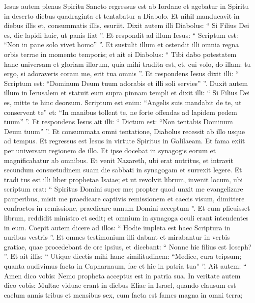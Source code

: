 \begin{biblechapter}
\begin{biblechapter}
\begin{biblechapter}
\begin{biblechapter}
\verse Iesus autem plenus Spiritu Sancto regressus est ab Iordane et agebatur in Spiritu in deserto 
\verse diebus quadraginta et tentabatur a Diabolo. Et nihil manducavit in diebus illis et, consummatis illis, esuriit. 
\verse Dixit autem illi Diabolus: “ Si Filius Dei es, dic lapidi huic, ut panis fiat ”. 
\verse Et respondit ad illum Iesus: “ Scriptum est: “Non in pane solo vivet homo” ”. 
\verse Et sustulit illum et ostendit illi omnia regna orbis terrae in momento temporis; 
 \verse et ait ei Diabolus: “ Tibi dabo potestatem hanc universam et gloriam illorum, quia mihi tradita est, et, cui volo, do illam: 
\verse tu ergo, si adoraveris coram me, erit tua omnis ”. 
\verse Et respondens Iesus dixit illi: “ Scriptum est: “Dominum Deum tuum adorabis et illi soli servies” ”. 
\verse Duxit autem illum in Ierusalem et statuit eum supra pinnam templi et dixit illi: “ Si Filius Dei es, mitte te hinc deorsum. 
\verse Scriptum est enim:
 “Angelis suis mandabit de te,
 ut conservent te”
 \verse et: “In manibus tollent te,
 ne forte offendas ad lapidem pedem tuum” ”.
 \verse Et respondens Iesus ait illi: “ Dictum est: “Non tentabis Dominum Deum tuum” ”. 
\verse Et consummata omni tentatione, Diabolus recessit ab illo usque ad tempus.
 \verse Et regressus est Iesus in virtute Spiritus in Galilaeam. Et fama exiit per universam regionem de illo. 
\verse Et ipse docebat in synagogis eorum et magnificabatur ab omnibus.
 \verse Et venit Nazareth, ubi erat nutritus, et intravit secundum consuetudinem suam die sabbati in synagogam et surrexit legere. 
\verse Et tradi tus est illi liber prophetae Isaiae; et
 ut revolvit librum, invenit locum, ubi scriptum erat:
 \verse “ Spiritus Domini super me;
 propter quod unxit me
 evangelizare pauperibus,
 misit me praedicare captivis remissionem
 et caecis visum,
 dimittere confractos in remissione,
 \verse praedicare annum Domini acceptum ”.
 \verse Et cum plicuisset librum, reddidit ministro et sedit; et omnium in synagoga oculi erant intendentes in eum. 
\verse Coepit autem dicere ad illos: “ Hodie impleta est haec Scriptura in auribus vestris ”. 
\verse Et omnes testimonium illi dabant et mirabantur in verbis gratiae, quae procedebant de ore ipsius, et dicebant: “ Nonne hic filius est Ioseph? ”. 
\verse Et ait illis: “ Utique dicetis mihi hanc similitudinem: “Medice, cura teipsum; quanta audivimus facta in Capharnaum, fac et hic in patria tua” ”. 
\verse Ait autem: “ Amen dico vobis: Nemo propheta acceptus est in patria sua. 
\verse In veritate autem dico vobis: Multae viduae erant in diebus Eliae in Israel, quando clausum est caelum annis tribus et mensibus sex, cum facta est fames magna in omni terra; 

\end{biblechapter}
\end{biblechapter}
\end{biblechapter}
\end{biblechapter}
